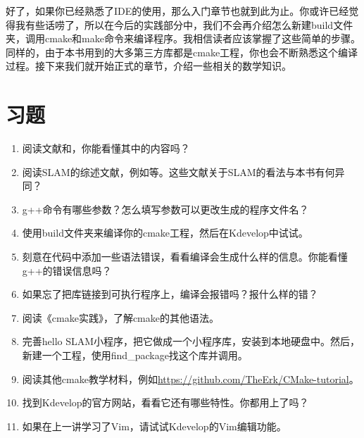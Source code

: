 好了，如果你已经熟悉了IDE的使用，那么入门章节也就到此为止。你或许已经觉得我有些话唠了，所以在今后的实践部分中，我们不会再介绍怎么新建build文件夹，调用cmake和make命令来编译程序。我相信读者应该掌握了这些简单的步骤。同样的，由于本书用到的大多第三方库都是cmake工程，你也会不断熟悉这个编译过程。接下来我们就开始正式的章节，介绍一些相关的数学知识。

\section*{习题}
\begin{enumerate}
	\item 阅读文献\cite{Liu2016}和\cite{Liang2013}，你能看懂其中的内容吗？
	\item[\optional] 阅读SLAM的综述文献，例如\cite{Cadena2016, Fuentes-Pacheco2015, Boal2014, Chen2012, Chen2007}等。这些文献关于SLAM的看法与本书有何异同？
	\item g++命令有哪些参数？怎么填写参数可以更改生成的程序文件名？
	\item 使用build文件夹来编译你的cmake工程，然后在Kdevelop中试试。
	\item 刻意在代码中添加一些语法错误，看看编译会生成什么样的信息。你能看懂g++的错误信息吗？
	\item 如果忘了把库链接到可执行程序上，编译会报错吗？报什么样的错？
	\item[\optional] 阅读《cmake实践》，了解cmake的其他语法。
	\item[\optional] 完善hello SLAM小程序，把它做成一个小程序库，安装到本地硬盘中。然后，新建一个工程，使用find\_package找这个库并调用。
	\item[\optional] 阅读其他cmake教学材料，例如\url{https://github.com/TheErk/CMake-tutorial}。
	\item 找到Kdevelop的官方网站，看看它还有哪些特性。你都用上了吗？
	\item 如果在上一讲学习了Vim，请试试Kdevelop的Vim编辑功能。
\end{enumerate}